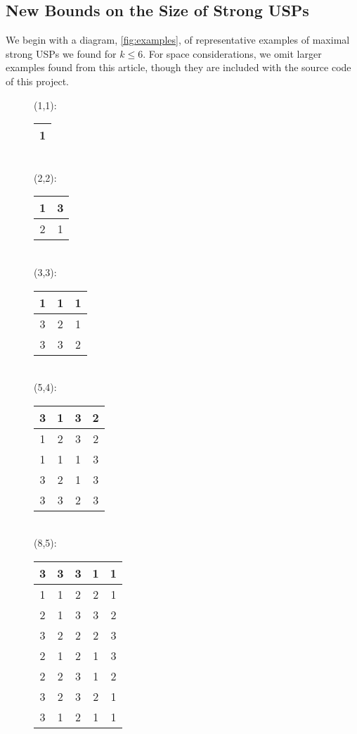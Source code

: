 \documentclass[11pt]{article}
\begin{document}
\subsection{New Bounds on the Size of Strong USPs}
\label{subsec:usps_found}

We begin with a diagram, \autoref{fig:examples}, of representative
examples of maximal strong USPs we found for $k \le 6$.  For space
considerations, we omit larger examples found from this article,
though they are included with the source code of this project.

\begin{figure}
  \label{fig:examples}
  \begin{multicols}{4}
  (1,1):\\[.5ex]
  \begin{tabular}{|c|}
    \hline
    1 \\ \hline
  \end{tabular}\\[6ex]

  (2,2):\\[.5ex]
  \begin{tabular}{|c|c|}
    \hline
    1&3 \\ \hline
    2&1 \\ \hline
  \end{tabular}\\[16ex]

  (3,3):\\[.5ex]
  \begin{tabular}{|c|c|c|}
    \hline
    1&1&1 \\ \hline
    3&2&1 \\ \hline
    3&3&2 \\ \hline
    \end{tabular}\\[2ex]

  (5,4):\\[.5ex]
  \begin{tabular}{|c|c|c|c|}
    \hline
    3&1&3&2 \\ \hline
    1&2&3&2 \\ \hline
    1&1&1&3 \\ \hline
    3&2&1&3 \\ \hline
    3&3&2&3 \\ \hline
  \end{tabular}\\[10ex]

  (8,5):\\[.5ex]
  \begin{tabular}{|c|c|c|c|c|}
    \hline
    3&3&3&1&1 \\ \hline
    1&1&2&2&1 \\ \hline
    2&1&3&3&2 \\ \hline
    3&2&2&2&3 \\ \hline
    2&1&2&1&3 \\ \hline
    2&2&3&1&2 \\ \hline
    3&2&3&2&1 \\ \hline
    3&1&2&1&1 \\ \hline
  \end{tabular}\\[16ex]


\end{multicols}
\end{figure}
\end{document}
